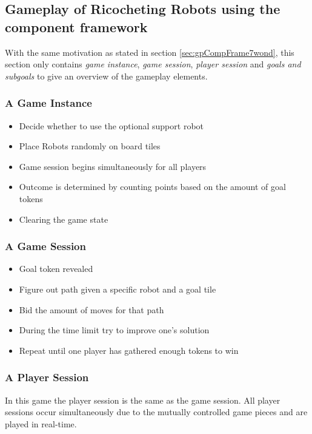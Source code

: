 \documentclass[a4paper]{article}
\begin{document}
\subsection{Gameplay of Ricocheting Robots using the component framework}
\label{sec:gpCompFrameRR}
With the same motivation as stated in section \ref{sec:gpCompFrame7wond}, this section only contains \textit{game instance}, \textit{game session}, \textit{player session} and \textit{goals and subgoals} to give an overview of the gameplay elements.

\subsubsection{A Game Instance}
\begin{itemize}[noitemsep,topsep=0pt,parsep=0pt,partopsep=0pt]
  \item Decide whether to use the optional support robot
  \item Place Robots randomly on board tiles
  \item Game session begins simultaneously for all players
  \item Outcome is determined by counting points based on the amount of goal tokens
  \item Clearing the game state
\end{itemize}

\subsubsection{A Game Session}
\begin{itemize}[noitemsep,topsep=0pt,parsep=0pt,partopsep=0pt]
  \item Goal token revealed
  \item Figure out path given a specific robot and a goal tile
  \item Bid the amount of moves for that path
  \item During the time limit try to improve one's solution
  \item Repeat until one player has gathered enough tokens to win
\end{itemize}

\subsubsection{A Player Session}
In this game the player session is the same as the game session. All player sessions occur simultaneously due to the mutually controlled game pieces and are played in real-time.
\end{document}
